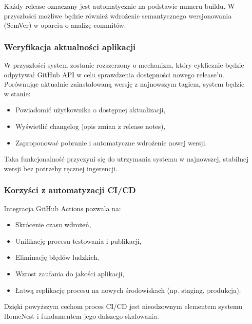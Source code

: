 Każdy release oznaczany jest automatycznie na podstawie numeru buildu. W przyszłości możliwe będzie również wdrożenie semantycznego wersjonowania (SemVer) w oparciu o analizę commitów.

\subsubsection{Weryfikacja aktualności aplikacji}

W przyszłości system zostanie rozszerzony o mechanizm, który cyklicznie będzie odpytywał GitHub API w celu sprawdzenia dostępności nowego release'u. Porównując aktualnie zainstalowaną wersję z najnowszym tagiem, system będzie w stanie:

\begin{itemize}
    \item Powiadomić użytkownika o dostępnej aktualizacji,
    \item Wyświetlić changelog (opis zmian z release notes),
    \item Zaproponować pobranie i automatyczne wdrożenie nowej wersji.
\end{itemize}

Taka funkcjonalność przyczyni się do utrzymania systemu w najnowszej, stabilnej wersji bez potrzeby ręcznej ingerencji.

\subsubsection{Korzyści z automatyzacji CI/CD}

Integracja GitHub Actions pozwala na:

\begin{itemize}
    \item Skrócenie czasu wdrożeń,
    \item Unifikację procesu testowania i publikacji,
    \item Eliminację błędów ludzkich,
    \item Wzrost zaufania do jakości aplikacji,
    \item Łatwą replikację procesu na nowych środowiskach (np. staging, produkcja).
\end{itemize}

Dzięki powyższym cechom proces CI/CD jest nieodzownym elementem systemu HomeNest i fundamentem jego dalszego skalowania.